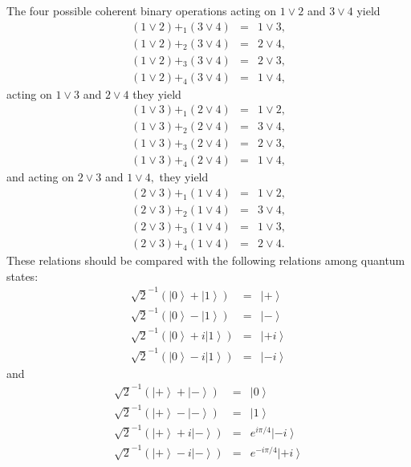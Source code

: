 \documentclass[pra,twocolumn,nofootinbib,showpacs]{revtex4}
\begin{document}
The four possible coherent binary operations acting on $1\vee 2$ and $3\vee
4 $ yield
\begin{eqnarray}
(1\vee 2)+_{\text{1}}(3\vee 4) &=&1\vee 3,  \label{bo1} \\
(1\vee 2)+_{\text{2}}(3\vee 4) &=&2\vee 4,  \label{bo2} \\
(1\vee 2)+_{\text{3}}(3\vee 4) &=&2\vee 3,  \label{bo3} \\
(1\vee 2)+_{\text{4}}(3\vee 4) &=&1\vee 4,  \label{bo4}
\end{eqnarray}
acting on $1\vee 3$ and $2\vee 4$ they yield
\begin{eqnarray}
(1\vee 3)+_{\text{1}}(2\vee 4) &=&1\vee 2,  \label{bo5} \\
(1\vee 3)+_{\text{2}}(2\vee 4) &=&3\vee 4,  \label{bo6} \\
(1\vee 3)+_{\text{3}}(2\vee 4) &=&2\vee 3,  \label{bo7} \\
(1\vee 3)+_{\text{4}}(2\vee 4) &=&1\vee 4,  \label{bo8}
\end{eqnarray}
and acting on $2\vee 3$ and $1\vee 4,$ they yield
\begin{eqnarray}
(2\vee 3)+_{\text{1}}(1\vee 4) &=&1\vee 2,  \label{bo9} \\
(2\vee 3)+_{\text{2}}(1\vee 4) &=&3\vee 4,  \label{bo10} \\
(2\vee 3)+_{\text{3}}(1\vee 4) &=&1\vee 3,  \label{bo11} \\
(2\vee 3)+_{\text{4}}(1\vee 4) &=&2\vee 4.  \label{bo12}
\end{eqnarray}
These relations should be compared with the following relations among
quantum states:
\begin{eqnarray}
\sqrt{2}^{-1}\left( \left| 0\right\rangle +\left| 1\right\rangle \right)
&=&\left| +\right\rangle  \label{cs1} \\
\sqrt{2}^{-1}\left( \left| 0\right\rangle -\left| 1\right\rangle \right)
&=&\left| -\right\rangle  \label{cs2} \\
\sqrt{2}^{-1}\left( \left| 0\right\rangle +i\left| 1\right\rangle \right)
&=&\left| +i\right\rangle  \label{cs3} \\
\sqrt{2}^{-1}\left( \left| 0\right\rangle -i\left| 1\right\rangle \right)
&=&\left| -i\right\rangle  \label{cs4}
\end{eqnarray}
and
\begin{eqnarray}
\sqrt{2}^{-1}\left( \left| +\right\rangle +\left| -\right\rangle \right)
&=&\left| 0\right\rangle  \label{cs5} \\
\sqrt{2}^{-1}\left( \left| +\right\rangle -\left| -\right\rangle \right)
&=&\left| 1\right\rangle  \label{cs6} \\
\sqrt{2}^{-1}\left( \left| +\right\rangle +i\left| -\right\rangle \right)
&=&e^{i\pi /4}\left| -i\right\rangle  \label{cs7} \\
\sqrt{2}^{-1}\left( \left| +\right\rangle -i\left| -\right\rangle \right)
&=&e^{-i\pi /4}\left| +i\right\rangle  \label{cs8}
\end{eqnarray}
\end{document}
